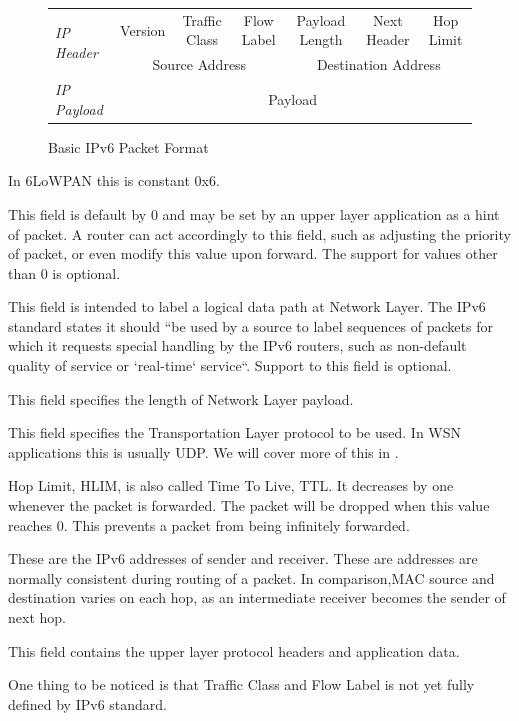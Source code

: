 \begin{figure}[h!]
\center
	\begin{tabular}{l|c|c|c|c|c|c|}
	\cline{2-7}
	\multirow{2}{*}{\textit{IP Header}} & Version & Traffic Class & Flow Label & Payload Length & Next Header & Hop Limit \\ \cline{2-7} 
	                                & \multicolumn{3}{c|}{Source Address}  & \multicolumn{3}{c|}{Destination Address} \\ \cline{2-7} 
	\textit{IP Payload}                 & \multicolumn{6}{c|}{Payload}                                                    \\ \cline{2-7} 
	\end{tabular}
	\caption{Basic IPv6 Packet Format} \label{Fig: IPv6 Packet Format}
\end{figure}

\begin{description}[style=nextline]
	\item[\textbf{Version}]
	In 6LoWPAN this is constant 0x6.
	\item[\textbf{Traffic Class}]
	This field is default by 0 and may be set by an upper layer application as a hint of packet. A router can act accordingly to this field, such as adjusting the priority of packet, or even modify this value upon forward. The support for values other than $0$ is optional.
	\item[\textbf{Flow Label}]
	This field is intended to label a logical data path at Network Layer. The IPv6 standard\cite{rfc2460} states  it should ``be used by a source to label sequences of packets for which it requests special handling by the IPv6 routers, such as non-default quality of service or `real-time` service``. Support to this field is optional.
	\item[\textbf{Payload Length}]
	This field specifies the length of Network Layer payload.
	\item[\textbf{Next Header}]
	This field specifies the Transportation Layer protocol to be used. In WSN applications this is usually UDP. We will cover more of this in .
	\item[\textbf{Hop Limit}]
	Hop Limit, HLIM, is also called Time To Live, TTL. It decreases by one whenever the packet is forwarded. The packet will be dropped when this value reaches $0$. This prevents a packet from being infinitely forwarded.
	\item[\textbf{Source Address and Destination Address}]
	These are the IPv6 addresses of sender and receiver. These are addresses are normally consistent during routing of a packet. In comparison,MAC source and destination varies on each hop, as an intermediate receiver becomes the sender of next hop.
	\item[\textbf{Payload}]
	This field contains the upper layer protocol headers and application data.
\end{description}
One thing to be noticed is that Traffic Class and Flow Label is not yet fully defined by IPv6 standard.

